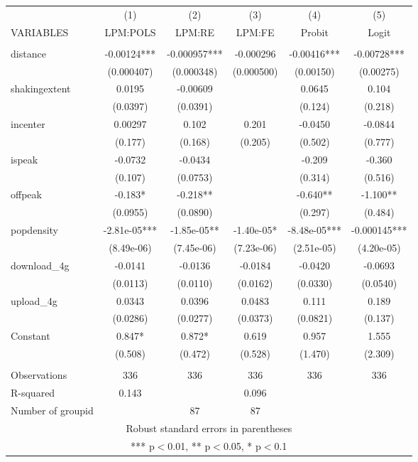 \documentclass[]{article}
\begin{document}
\begin{tabular}{lccccc} \hline
 & (1) & (2) & (3) & (4) & (5) \\
VARIABLES & LPM:POLS & LPM:RE & LPM:FE & Probit & Logit \\ \hline
 &  &  &  &  &  \\
distance & -0.00124*** & -0.000957*** & -0.000296 & -0.00416*** & -0.00728*** \\
 & (0.000407) & (0.000348) & (0.000500) & (0.00150) & (0.00275) \\
shakingextent & 0.0195 & -0.00609 &  & 0.0645 & 0.104 \\
 & (0.0397) & (0.0391) &  & (0.124) & (0.218) \\
incenter & 0.00297 & 0.102 & 0.201 & -0.0450 & -0.0844 \\
 & (0.177) & (0.168) & (0.205) & (0.502) & (0.777) \\
ispeak & -0.0732 & -0.0434 &  & -0.209 & -0.360 \\
 & (0.107) & (0.0753) &  & (0.314) & (0.516) \\
offpeak & -0.183* & -0.218** &  & -0.640** & -1.100** \\
 & (0.0955) & (0.0890) &  & (0.297) & (0.484) \\
popdensity & -2.81e-05*** & -1.85e-05** & -1.40e-05* & -8.48e-05*** & -0.000145*** \\
 & (8.49e-06) & (7.45e-06) & (7.23e-06) & (2.51e-05) & (4.20e-05) \\
download\_4g & -0.0141 & -0.0136 & -0.0184 & -0.0420 & -0.0693 \\
 & (0.0113) & (0.0110) & (0.0162) & (0.0330) & (0.0540) \\
upload\_4g & 0.0343 & 0.0396 & 0.0483 & 0.111 & 0.189 \\
 & (0.0286) & (0.0277) & (0.0373) & (0.0821) & (0.137) \\
Constant & 0.847* & 0.872* & 0.619 & 0.957 & 1.555 \\
 & (0.508) & (0.472) & (0.528) & (1.470) & (2.309) \\
 &  &  &  &  &  \\
Observations & 336 & 336 & 336 & 336 & 336 \\
R-squared & 0.143 &  & 0.096 &  &  \\
 Number of groupid &  & 87 & 87 &  &  \\ \hline
\multicolumn{6}{c}{ Robust standard errors in parentheses} \\
\multicolumn{6}{c}{ *** p$<$0.01, ** p$<$0.05, * p$<$0.1} \\
\end{tabular}
\end{document}
